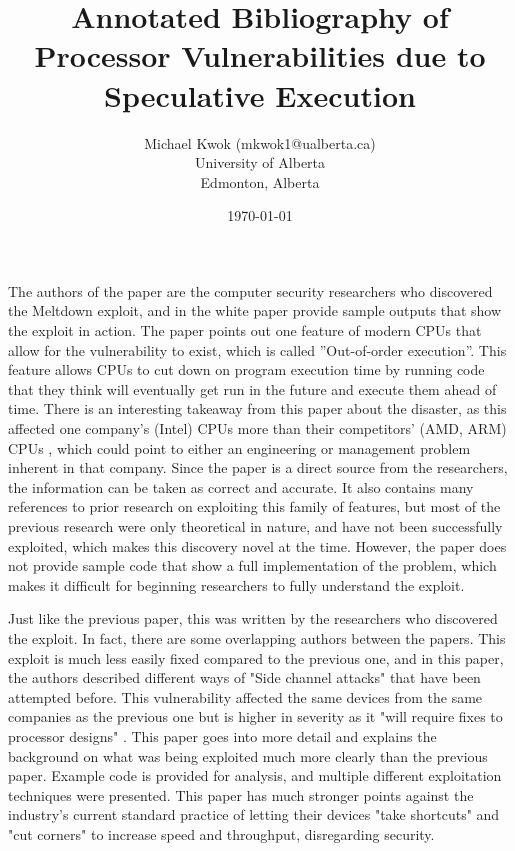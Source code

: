 \documentclass[11pt]{article}
\title{Annotated Bibliography of \\ Processor Vulnerabilities due to \\
Speculative Execution}
\author{Michael Kwok (mkwok1@ualberta.ca) \\ University of Alberta \\ Edmonton,
Alberta}
\date{\today}
\begin{document}
\pagestyle{headings}
\maketitle

\cite{Meltdown} 

The authors of the paper are the computer security researchers who discovered
the Meltdown exploit, and in the white paper provide sample outputs that show
the exploit in action. The paper points out one feature of modern CPUs that
allow for the vulnerability to exist, which is called ”Out-of-order execution”.
This feature allows CPUs to cut down on program execution time by running code
that they think will eventually get run in the future and execute them ahead of
time. There is an interesting takeaway from this paper about the disaster, as
this affected one company’s (Intel) CPUs more than their competitors’ (AMD, ARM)
CPUs \cite[13]{Meltdown}, which could point to either an engineering or
management problem inherent in that company. Since the paper is a direct source
from the researchers, the information can be taken as correct and accurate. It
also contains many references to prior research on exploiting this family of
features, but most of the previous research were only theoretical in nature,
and have not been successfully exploited, which makes this discovery novel at
the time. However, the paper does not provide sample code that show a full
implementation of the problem, which makes it difficult for beginning
researchers to fully understand the exploit.

\hfill

\cite{Spectre} 

Just like the previous paper, this was written by the researchers who
discovered the exploit. In fact, there are some overlapping authors between the
papers. This exploit is much less easily fixed compared to the previous one, and
in this paper, the authors described different ways of "Side channel attacks"
that have been attempted before. This vulnerability affected the same devices from
the same companies as the previous one but is higher in severity as it "will
require fixes to processor designs" \cite[1]{Spectre}. This paper goes into more
detail and explains the background on what was being exploited much more
clearly than the previous paper. Example code is provided for analysis, and
multiple different exploitation techniques were presented. This paper has much
stronger points against the industry's current standard practice of letting their
devices "take shortcuts" and "cut corners" to increase speed and throughput,
disregarding security.
\end{document}
